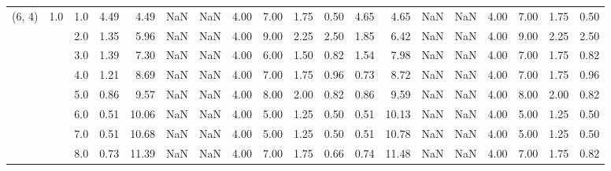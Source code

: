 \begin{tabular}{lllrrrrrrrrrrrrrrrr}
(6, 4) & 1.0 & 1.0  &      4.49 &       4.49 &               NaN &                NaN & 4.00 &   7.00 &             1.75 &                         0.50 &      4.65 &       4.65 &               NaN &                NaN & 4.00 &   7.00 &             1.75 &                         0.50 \\
       &     & 2.0  &      1.35 &       5.96 &               NaN &                NaN & 4.00 &   9.00 &             2.25 &                         2.50 &      1.85 &       6.42 &               NaN &                NaN & 4.00 &   9.00 &             2.25 &                         2.50 \\
       &     & 3.0  &      1.39 &       7.30 &               NaN &                NaN & 4.00 &   6.00 &             1.50 &                         0.82 &      1.54 &       7.98 &               NaN &                NaN & 4.00 &   7.00 &             1.75 &                         0.82 \\
       &     & 4.0  &      1.21 &       8.69 &               NaN &                NaN & 4.00 &   7.00 &             1.75 &                         0.96 &      0.73 &       8.72 &               NaN &                NaN & 4.00 &   7.00 &             1.75 &                         0.96 \\
       &     & 5.0  &      0.86 &       9.57 &               NaN &                NaN & 4.00 &   8.00 &             2.00 &                         0.82 &      0.86 &       9.59 &               NaN &                NaN & 4.00 &   8.00 &             2.00 &                         0.82 \\
       &     & 6.0  &      0.51 &      10.06 &               NaN &                NaN & 4.00 &   5.00 &             1.25 &                         0.50 &      0.51 &      10.13 &               NaN &                NaN & 4.00 &   5.00 &             1.25 &                         0.50 \\
       &     & 7.0  &      0.51 &      10.68 &               NaN &                NaN & 4.00 &   5.00 &             1.25 &                         0.50 &      0.51 &      10.78 &               NaN &                NaN & 4.00 &   5.00 &             1.25 &                         0.50 \\
       &     & 8.0  &      0.73 &      11.39 &               NaN &                NaN & 4.00 &   7.00 &             1.75 &                         0.66 &      0.74 &      11.48 &               NaN &                NaN & 4.00 &   7.00 &             1.75 &                         0.82 \\

\end{tabular}
